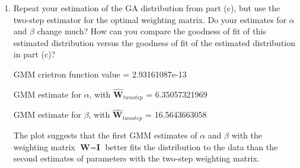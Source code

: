 \documentclass[letterpaper,12pt]{article}
\theoremstyle{definition}
\begin{document}
\begin{enumerate}
\begin{enumerate}
\item Repeat your estimation of the GA distribution from part (c), but use the two-step estimator for the optimal weighting matrix. Do your estimates for $\alpha$ and $\beta$ change much? How can you compare the goodness of fit of this estimated distribution versus the goodness of fit of the estimated distribution in part (c)?
\par
\begin{figure}[H]\centering\captionsetup{width=4.0in}
\end{figure}
\par
GMM crietron function value = 2.93161087e-13\par
GMM estimate for $\alpha$, with $\hat{\textbf{W}}_{twostep}$ = 6.35057321969  \par
GMM estimate for $\beta$, with $\hat{\textbf{W}}_{twostep}$ = 16.5643663058\par
\bigskip
The plot suggests that the first GMM estimates of $\alpha$ and $\beta$ with the weighting matrix $\textbf{W} = \textbf{I}$ better fits the distribution to the data than the second estimates of parameters with the two-step weighting matrix. 
\end {enumerate}
\end {enumerate}
\end{document}
